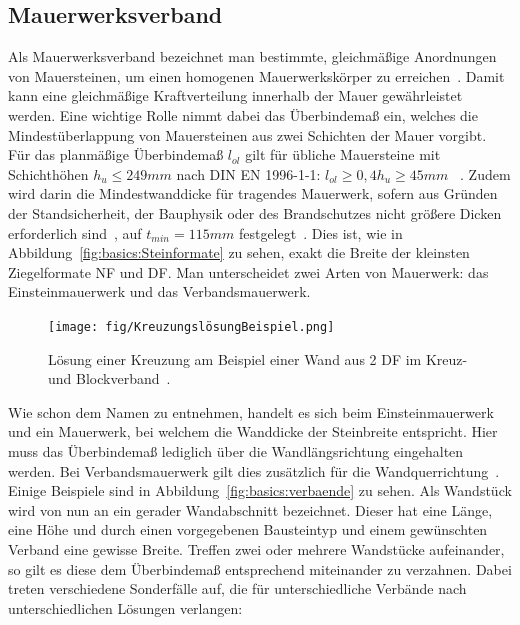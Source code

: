 \subsection{Mauerwerksverband}\label{basics:Mauerwerksverband}
Als Mauerwerksverband bezeichnet man bestimmte, gleichmäßige Anordnungen von Mauersteinen, um einen homogenen Mauerwerkskörper zu erreichen~\cite{Mauerwer39:online}.
Damit kann eine gleichmäßige Kraftverteilung innerhalb der Mauer gewährleistet werden.
Eine wichtige Rolle nimmt dabei das Überbindemaß ein, welches die Mindestüberlappung von Mauersteinen aus zwei Schichten der Mauer vorgibt.
Für das planmäßige Überbindemaß \(l_{ol}\) gilt für übliche Mauersteine mit Schichthöhen 
\(h_{u} \leq 249 mm\) 
nach DIN EN 1996-1-1: 
\(l_{ol} \geq 0,4h_{u} \geq 45 mm\)
~\cite{Bemessun72:online}\cite{DIN_EN_1996_1_1}.
Zudem wird darin die Mindestwanddicke für tragendes Mauerwerk, \glqq{}sofern aus Gründen der Standsicherheit, der Bauphysik oder des Brandschutzes nicht größere Dicken erforderlich sind\grqq{}~\cite{Bemessun72:online}, auf 
\(t_{min} = 115 mm\) 
festgelegt~\cite{DIN_EN_1996_1_1}.
Dies ist, wie in Abbildung~\ref{fig:basics:Steinformate} zu sehen, exakt die Breite der kleinsten Ziegelformate NF und DF.
Man unterscheidet zwei Arten von Mauerwerk: das Einsteinmauerwerk und das Verbandsmauerwerk.
\begin{figure}[htb]
  \centering
  \texttt{[image: fig/KreuzungslösungBeispiel.png]}
  \caption{Lösung einer Kreuzung am Beispiel einer \glqq{}Wand aus 2 DF im Kreuz- und Blockverband\grqq{}~\cite{MaurerfibelKreuzungen:online}.}\label{fig:basics:Kreuzungsloesung}
\end{figure}
Wie schon dem Namen zu entnehmen, handelt es sich beim Einsteinmauerwerk und ein Mauerwerk, bei welchem die Wanddicke der Steinbreite entspricht.
Hier muss das Überbindemaß lediglich über die Wandlängsrichtung eingehalten werden.
Bei Verbandsmauerwerk gilt dies zusätzlich für die Wandquerrichtung~\cite{05maurer1:online}.
Einige Beispiele sind in Abbildung~\ref{fig:basics:verbaende} zu sehen.
Als Wandstück wird von nun an ein gerader Wandabschnitt bezeichnet.
Dieser hat eine Länge, eine Höhe und durch einen vorgegebenen Bausteintyp und einem gewünschten Verband eine gewisse Breite.
Treffen zwei oder mehrere Wandstücke aufeinander, so gilt es diese dem Überbindemaß entsprechend miteinander zu verzahnen.
Dabei treten verschiedene Sonderfälle auf, die für unterschiedliche Verbände nach unterschiedlichen Lösungen verlangen:
